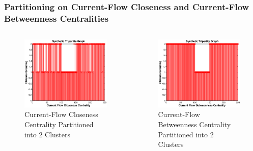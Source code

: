 \documentclass{beamer}
\begin{document}
\begin{frame}
\frametitle{Partitioning on Current-Flow Closeness and Current-Flow Betweenness Centralities}
\begin{columns}[T]
\begin{column}{.5\textwidth}
\begin{figure}[h]
\begin{center}
\includegraphics[width=0.76\columnwidth]{cfclose_kmeans}
\end{center}
\caption{Current-Flow Closeness Centrality Partitioned into 2 Clusters}
\label{fig:Current Flow closeness and k-means}
\end{figure}
\end{column}
\begin{column}{.5\textwidth}
\begin{figure}[h]
\begin{center}
\includegraphics[width=0.76\columnwidth]{cfbetw_kmeans}
\end{center}
\caption{Current-Flow Betweenness Centrality Partitioned into 2 Clusters}
\label{fig:Current Flow betweenness and k-means}
\end{figure}
\end{column}
\end{columns}
\end{frame}
\end{document}
